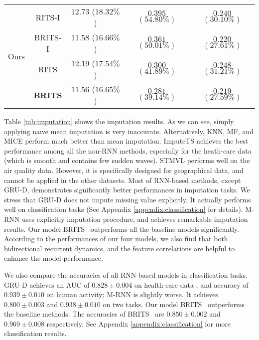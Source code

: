 \documentclass{article}
\newcommand{\ritsi}{\xspace{RITS-I}}
\newcommand{\britsi}{\xspace{BRITS-I}}
\newcommand{\rits}{\xspace{RITS}}
\newcommand{\brits}{\xspace{BRITS}}
\begin{document}
\begin{table}[t!]
\begin{tabular}{c|c|c|c|c}
\multirow{4}{*}{Ours}    & \ritsi                        & $12.73$ ($18.32\%$)                           & $0.395$ $(54.80\%)$                   & $0.240$ $(30.10\%)$                   \\ \cline{2-5} 
                         & \britsi                       & $11.58$ ($16.66\%$)                           & $0.361$ $(50.01\%)$                   & $0.220$ $(27.61\%)$                   \\ \cline{2-5} 
                         & \rits                         & $12.19$ ($17.54\%$)                           & $0.300$ $(41.89\%)$                   & $0.248$ $(31.21\%)$                   \\ \cline{2-5} 
                         & {\bf \brits} & $\mathbf{11.56}$ ($\mathbf{16.65\%}$)         & $\mathbf{0.281}$ $\mathbf{(39.14\%)}$ & $\mathbf{0.219}$ $\mathbf{(27.59\%)}$ \\ \hline
\end{tabular}
\end{table}

Table \ref{tab:imputation} shows the imputation results. 
As we can see, simply applying na\i ve mean imputation is very inaccurate. Alternatively, KNN, MF, and MICE perform much better than mean imputation. ImputeTS achieves the best performance among all the non-RNN methods, especially for the heath-care data (which is smooth and contains few sudden waves). STMVL performs well on the air quality data. However, it is specifically designed for geographical data, and cannot be applied in the other datasets. Most of RNN-based methods, except GRU-D, demonstrates significantly better performances in imputation tasks. We stress that GRU-D does not impute missing value explicitly. It actually performs well on classification tasks (See Appendix \ref{appendix:classification} for details).
 M-RNN uses explicitly imputation procedure, and achieves remarkable imputation results.  Our model \brits~ outperforms all the baseline models significantly. According to the performances of our four models, we also find that both bidirectional recurrent dynamics, and the feature correlations are helpful to enhance the model performance.

We also compare the accuracies of all RNN-based models in classification tasks.
GRU-D achieves an AUC of $0.828 \pm 0.004$ on health-care data , and accuracy  of $0.939 \pm 0.010$ on human activity; M-RNN is slightly worse. It achieves $0.800 \pm 0.003$ and $0.938 \pm 0.010$ on two tasks. Our model \brits~ outperforms the baseline methods. The accuracies of \brits~ are ${0.850 \pm 0.002}$ and ${0.969 \pm 0.008}$ respectively. See Appendix \ref{appendix:classification} for more classification results.
\end{document}
